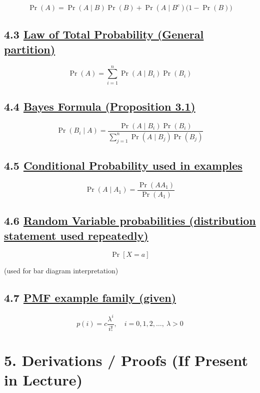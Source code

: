 \documentclass[11pt]{article}
\begin{document}
\[
\Pr(A)=\Pr(A\mid B)\Pr(B)+\Pr(A\mid B^c)\bigl(1-\Pr(B)\bigr)
\]

\vspace{0.5cm}
\subsection*{4.3 \underline{Law of Total Probability (General partition)}}

\[
\Pr(A)=\sum_{i=1}^{n}\Pr(A\mid B_i)\Pr(B_i)
\]

\vspace{0.5cm}
\subsection*{4.4 \underline{Bayes Formula (Proposition 3.1)}}

\[
\Pr(B_i\mid A)=\frac{\Pr(A\mid B_i)\Pr(B_i)}{\sum_{j=1}^{n}\Pr(A\mid B_j)\Pr(B_j)}
\]

\vspace{0.5cm}
\subsection*{4.5 \underline{Conditional Probability used in examples}}

\[
\Pr(A\mid A_1)=\frac{\Pr(AA_1)}{\Pr(A_1)}
\]

\vspace{0.5cm}
\subsection*{4.6 \underline{Random Variable probabilities (distribution statement used repeatedly)}}

\[
\Pr[X=a]
\]

(used for bar diagram interpretation)

\vspace{0.5cm}
\subsection*{4.7 \underline{PMF example family (given)}}

\[
p(i)=c\frac{\lambda^i}{i!},\quad i=0,1,2,\dots,\ \lambda>0
\]

\vspace{1cm}
\section*{5. Derivations / Proofs (If Present in Lecture)}
\end{document}
